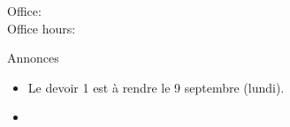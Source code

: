 \documentclass{beamer}
\subtitle[Activités]{Les activités, les verbes \lexi{-er} et la négation}
\begin{document}
  \begin{frame}
    \titlepage
    \tiny{Office: \\
          Office hours: }
  \end{frame}

  \begin{frame}{Annonces }
    \begin{itemize}
      \item Le devoir 1 est à rendre le 9 septembre (lundi).
      \item[] 
    \end{itemize}
  \end{frame}

\end{document}
